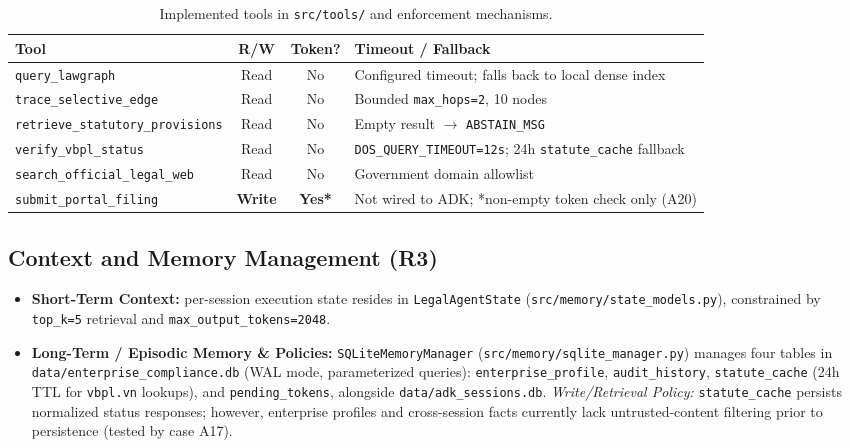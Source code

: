 \documentclass[sigconf,nonacm]{acmart}
\begin{document}
\begin{table}[t]
\caption{Implemented tools in \texttt{src/tools/} and enforcement mechanisms.}
\label{tab:tools}
\scriptsize
\begin{tabular}{@{}p{2.35cm}ccp{2.65cm}@{}}
\toprule
\textbf{Tool} & \textbf{R/W} & \textbf{Token?} & \textbf{Timeout / Fallback} \\
\midrule
\texttt{query\_lawgraph} & Read & No & Configured timeout; falls back to local dense index \\
\texttt{trace\_selective\_edge} & Read & No & Bounded \texttt{max\_hops=2}, 10 nodes \\
\texttt{retrieve\_statutory\_\allowbreak provisions} & Read & No & Empty result $\rightarrow$ \texttt{ABSTAIN\_MSG} \\
\texttt{verify\_vbpl\_status} & Read & No & \texttt{DOS\_QUERY\_TIMEOUT=12s}; 24h \texttt{statute\_cache} fallback \\
\texttt{search\_official\_\allowbreak legal\_web} & Read & No & Government domain allowlist \\
\texttt{submit\_portal\_filing} & \textbf{Write} & \textbf{Yes*} & Not wired to ADK; *non-empty token check only (A20) \\
\bottomrule
\end{tabular}
\end{table}

\subsection{Context and Memory Management (R3)}
\begin{itemize}[leftmargin=*]
  \item \textbf{Short-Term Context:} per-session execution state resides in \texttt{LegalAgentState} (\texttt{src/memory/state\_models.py}), constrained by \texttt{top\_k=5} retrieval and \texttt{max\_output\_tokens=2048}.
  \item \textbf{Long-Term / Episodic Memory \& Policies:} \texttt{SQLiteMemoryManager} (\texttt{src/memory/sqlite\_manager.py}) manages four tables in \texttt{data/enterprise\_compliance.db} (WAL mode, parameterized queries): \texttt{enterprise\_profile}, \texttt{audit\_history}, \texttt{statute\_cache} (24h TTL for \texttt{vbpl.vn} lookups), and \texttt{pending\_tokens}, alongside \texttt{data/adk\_sessions.db}. \emph{Write/Retrieval Policy:} \texttt{statute\_cache} persists normalized status responses; however, enterprise profiles and cross-session facts currently lack untrusted-content filtering prior to persistence (tested by case A17).
\end{itemize}
\end{document}
